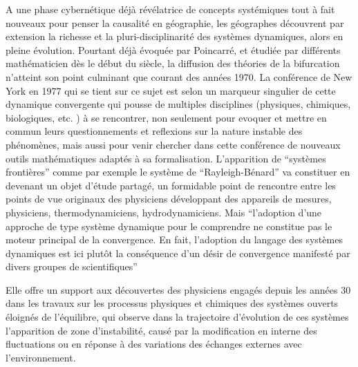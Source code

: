 A une phase cybernétique déjà révélatrice de concepts systémiques tout à fait nouveaux pour penser la causalité en géographie, les géographes découvrent par extension la richesse et la pluri-disciplinarité des systèmes dynamiques, alors en pleine évolution. Pourtant déjà évoquée par Poincarré, et étudiée par différents mathématicien dès le début du siècle, la diffusion des théories de la bifurcation n'atteint son point culminant que courant des années 1970. La conférence de New York en 1977 qui se tient sur ce sujet est selon \textcite{Dahan1991} un marqueur singulier de cette dynamique convergente qui pousse de multiples disciplines (physiques, chimiques, biologiques, etc. ) à se rencontrer, non seulement pour evoquer et mettre en commun leurs questionnements et reflexions sur la nature instable des phénomènes, mais aussi pour venir chercher dans cette conférence de nouveaux outils mathématiques adaptés à sa formalisation. L'apparition de \enquote{systèmes frontières} comme par exemple le système de \enquote{Rayleigh-Bénard} va constituer en devenant un objet d'étude partagé, un formidable point de rencontre entre les points de vue originaux des physiciens développant des appareils de mesures, physiciens, thermodynamiciens, hydrodynamiciens. Mais \enquote{l’adoption d’une approche de type système dynamique pour le comprendre ne constitue pas le moteur principal de la convergence. En fait, l’adoption du langage des systèmes dynamiques est ici plutôt la conséquence d’un désir de convergence manifesté par divers groupes de scientifiques} \textcite{Dahan1991}





Elle offre un support aux découvertes des physiciens engagés depuis les années 30 dans les travaux sur les processus physiques et chimiques des systèmes ouverts éloignés de l'équilibre, qui observe dans la trajectoire d'évolution de ces systèmes l'apparition de zone d'instabilité, causé par la modification en interne des fluctuations ou en réponse à des variations des échanges externes avec l'environnement.

